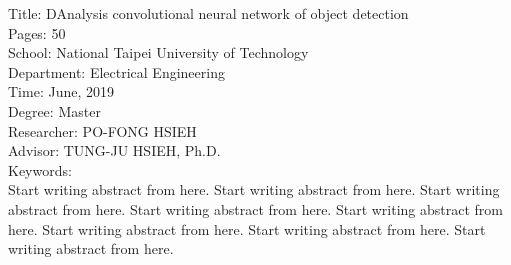 \begin{abstractEN}

\noindent
Title: DAnalysis convolutional neural network of object detection\\
Pages: 50\\
School: National Taipei University of Technology\\
Department: Electrical Engineering\\
Time: June, 2019\\
Degree: Master\\
Researcher: PO-FONG HSIEH\\
Advisor: TUNG-JU HSIEH, Ph.D.\\

\noindent
Keywords: \\


Start writing abstract from here. Start writing abstract from here. Start writing abstract from here. Start writing abstract from here. Start writing abstract from here. Start writing abstract from here. Start writing abstract from here. Start writing abstract from here.


\end{abstractEN}
